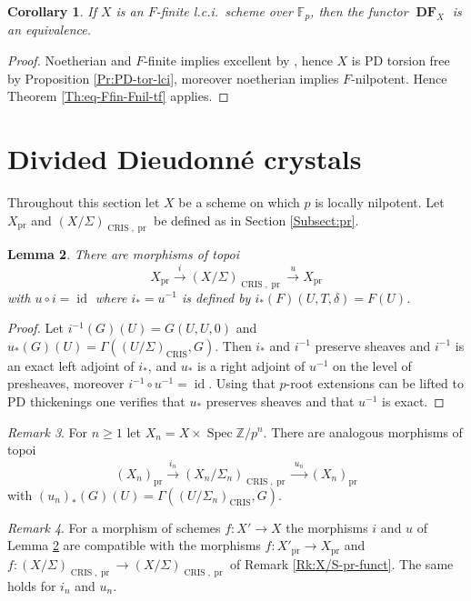 \documentclass[a4paper,11pt]{article}
\theoremstyle{plain}
\newtheorem{Lemma}{Lemma}
\newtheorem{Cor}[Lemma]{Corollary}
\theoremstyle{definition}
\theoremstyle{remark}
\newtheorem{Remark}[Lemma]{Remark}
\theoremstyle{definition}
\numberwithin{Lemma}{section}
\numberwithin{Subpoint}{Lemma}
\numberwithin{equation}{section}
\newcommand{\DD}{{\mathbb{D}}}
\newcommand{\FF}{{\mathbb{F}}}
\newcommand{\ZZ}{{\mathbb{Z}}}
\DeclareMathOperator{\DFfun}{\mathbf{DF}} %
\DeclareMathOperator{\CRIS}{CRIS}
\DeclareMathOperator{\Spec}{Spec}
\DeclareMathOperator{\id}{id}
\newcommand{\nameoftop}{{\operatorname{pr}}}
\newcommand{\chang}[1]{{#1}}
\begin{document}
\begin{Cor}
\label{Co:eq-lci}
If $X$ is an $F$-finite l.c.i.\ scheme over $\FF_p$, 
then \chang{the functor} $\DFfun_X$ is an equivalence.
\end{Cor}

\begin{proof}
Noetherian and $F$-finite implies excellent by
\cite[Th.~2.5]{Kunz:Noetherian}, 
hence $X$ is PD torsion free by 
Proposition \ref{Pr:PD-tor-lci},
moreover noetherian implies $F$-nilpotent.
\chang{Hence Theorem \ref{Th:eq-Ffin-Fnil-tf} applies.}
\end{proof}

\section{Divided Dieudonn\'e crystals}
\label{Se:divided}

Throughout this section
let $X$ be a scheme on which $p$ is locally nilpotent.
Let $X_\nameoftop$ and $(X/\Sigma)_{\CRIS,\nameoftop}$
be defined as in Section \ref{Subsect:pr}.

\begin{Lemma}
\label{Le:iu}
There are morphisms of topoi
\[
X_{\nameoftop}\xrightarrow {\;i\;}(X/\Sigma)_{\CRIS,\nameoftop}\xrightarrow{\;u\;} X_{\nameoftop}
\]
with $u\circ i=\id$ where $i_*=u^{-1}$ is defined by 
$i_*(F)(U,T,\delta)=F(U)$.
\end{Lemma}

\begin{proof}
Let $i^{-1}(G)(U)=G(U,U,0)$ and $u_*(G)(U)=\Gamma((U/\Sigma)_{\CRIS},G)$.
Then $i_*$ and $i^{-1}$ preserve sheaves and $i^{-1}$ is an
exact left adjoint of $i_*$, and $u_*$ is a right adjoint of $u^{-1}$
on the level of presheaves,
moreover $i^{-1}\circ u^{-1}=\id$. 
Using that $p$-root extensions can be lifted to PD thickenings
one verifies that $u_*$ preserves sheaves and that $u^{-1}$ is exact.
\end{proof}

\begin{Remark}
For $n\ge 1$ let $X_n=X\times\Spec\ZZ/p^n$.
There are analogous morphisms of topoi
\[
(X_n)_{\nameoftop}\xrightarrow {\;i_n\;}(X_n/\Sigma_n)_{\CRIS,\nameoftop}
\xrightarrow{\;u_n\;} (X_n)_{\nameoftop}
\]
with $(u_n)_*(G)(U)=\Gamma((U/\Sigma_n)_{\CRIS},G)$.
\end{Remark}

\begin{Remark}
For a morphism of schemes $f:X'\to X$ 
the morphisms $i$ and $u$ of Lemma \ref{Le:iu} 
are compatible with the morphisms $f:X'_{\nameoftop}\to X_{\nameoftop}$
and $f:(X/\Sigma)_{\CRIS,\nameoftop}\to(X/\Sigma)_{\CRIS,\nameoftop}$
of Remark \ref{Rk:X/S-pr-funct}.
The same holds for $i_n$ and $u_n$.
\end{Remark}
\end{document}

